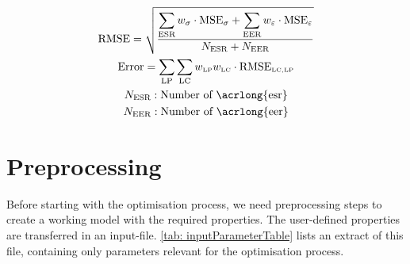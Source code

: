 \begin{gather}
    \label{eq: rmse}
        \text{RMSE} = \sqrt{\frac{\displaystyle\sum_{\text{ESR}} w_{\sigma} \cdot \text{MSE}_{\sigma} + \displaystyle\sum_{\text{EER}} w_{\varepsilon} \cdot \text{MSE}_{\varepsilon}}{N_\text{ESR} + N_\text{EER}}} \\
        \label{eq: error}
    \text{Error} = \sum_{\text{LP}} \sum_{\text{LC}} w_{\scriptscriptstyle\text{LP}} w_{\scriptscriptstyle\text{LC}} \cdot \text{RMSE}_{\scriptscriptstyle \text{LC}, \text{LP}} \\
        N_\text{ESR}: \text{Number of \acrlong{esr}} \nonumber\\
    N_\text{EER}: \text{Number of \acrlong{eer}} \nonumber
\end{gather}


\section{Preprocessing} \label{sec: preprocessing}
Before starting with the optimisation process, we need preprocessing steps to create a working  model with the required properties. The user-defined properties are transferred in an input-file. \autoref{tab: inputParameterTable} lists an extract of this file, containing only parameters relevant for the optimisation process.

